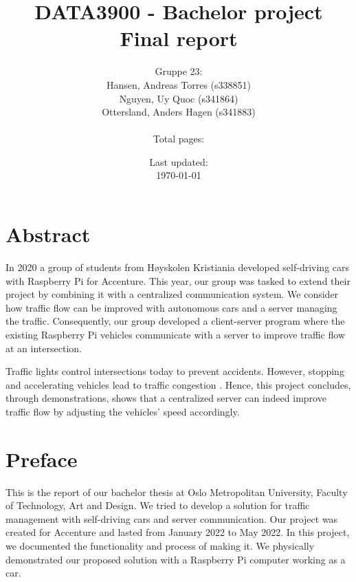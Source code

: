 \documentclass[14pt, a4paper, english]{report}
\title
{
	DATA3900 - Bachelor project \\
	Final report
}
\author{Gruppe 23:\\
    Hansen, Andreas Torres (s338851)\\
	Nguyen, Uy Quoc (s341864)\\
	Ottersland, Anders Hagen (s341883)\\
	\\Total pages: \pageref{LastPage}}
\date{Last updated:\\ \today}
\begin{document}
	
	\maketitle
	\tableofcontents
	\clearpage
	\pagestyle{fancy}
	\part*{Abstract}
	In 2020 a group of students from Høyskolen Kristiania developed self-driving cars with Raspberry Pi for Accenture. This year, our group was tasked to extend their project by combining it with a centralized communication system. We consider how traffic flow can be improved with autonomous cars and a server managing the traffic. Consequently, our group developed a client-server program where the existing Raspberry Pi vehicles communicate with a server to improve traffic flow at an intersection.
	
	Traffic lights control intersections today to prevent accidents. However, stopping and accelerating vehicles lead to traffic congestion \parencite{traffic_shockwave}. Hence, this project concludes, through demonstrations, shows that a centralized server can indeed improve traffic flow by adjusting the vehicles' speed accordingly.
	\clearpage
	
	\part*{Preface}
	This is the report of our bachelor thesis at Oslo Metropolitan University, Faculty of Technology, Art and Design. We tried to develop a solution for traffic management with self-driving cars and server communication. Our project was created for Accenture and lasted from January 2022 to May 2022. In this project, we documented the functionality and process of making it. We physically demonstrated our proposed solution with a Raspberry Pi computer working as a car. 
	
\end{document}
